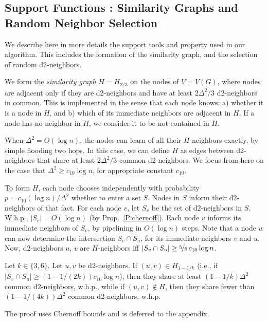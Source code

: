 \subsection{Support Functions : Similarity Graphs and Random Neighbor Selection}
\label{ssec:similarity}
We describe here in more details the support tools and property used in our algorithm.
This includes the formation of the similarity graph, and the selection of random d2-neighbors. 

%
%
We form the \emph{similarity graph} $H = H_{2/3}$ on the nodes of $V = V(G)$, where nodes are adjacent only if they are d2-neighbors and have at least $2\Delta^2/3$ d2-neighbors in common.
This is implemented in the sense that each node knows:
a) whether it is a node in $H$, and
b) which of its immediate neighbors are adjacent in $H$.
If a node has no neighbor in $H$, we consider it to be not contained in $H$.

When $\Delta^2 = O(\log n)$, the nodes can learn of all their $H$-neighbors exactly, by simple flooding two hops. In this case, we can define $H$ as edges between d2-neighbors that share at least $2\Delta^2/3$ common d2-neighbors. We focus from here on the case that $\Delta^2 \ge c_{10}\log n$, for appropriate constant $c_{10}$.

To form $H$, each node chooses independently with probability $p = c_{10}(\log n)/\Delta^2$ whether to enter a set $S$. Nodes in $S$ inform their d2-neighbors of that fact. For each node $v$, let $S_v$ be the set of d2-neighbors in $S$. W.h.p., $|S_v| = O(\log n)$ (by Prop.~\ref{P:chernoff}). Each node $v$ informs its immediate neighbors of $S_v$, by pipelining in $O(\log n)$ steps.
Note that a node $w$ can now determine the intersection $S_v \cap S_u$, for its immediate neighbors $v$ and $u$.
Now, d2-neighbors $u$, $v$ are $H$-neighbors iff $|S_v \cap S_u| \ge \nicefrac{5}{6}\, c_{10} \log n$. 
%
\begin{theorem}
Let $k \in \{3,6\}$.
Let $u,v$ be d2-neighbors. 
If $(u,v) \in H_{1-1/k}$ (i.e., if $|S_v \cap S_u| \ge (1-1/(2k)) c_{10} \log n$), then they share at least $(1-1/k) \Delta^2$ common d2-neighbors, w.h.p.,
while if $(u,v) \not\in H$, then they share fewer than $(1-1/(4k)) \Delta^2$ common d2-neighbors, w.h.p.
\label{T:similarity}
\end{theorem}
The proof uses Chernoff bounds and is deferred to the appendix. 


